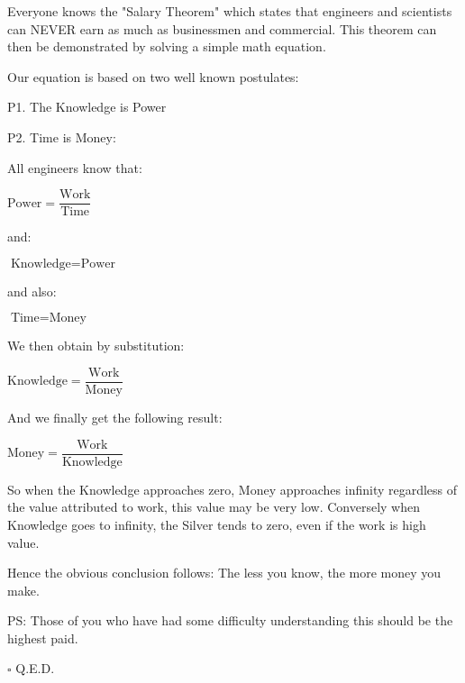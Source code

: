 Everyone knows the "Salary Theorem" which states that engineers and scientists can NEVER earn as much as businessmen and commercial. This theorem can then be demonstrated by solving a simple math equation.

Our equation is based on two well known postulates:

P1. The Knowledge is Power

P2. Time is Money:

All engineers know that:

\begin{center}
$\text{Power}=\dfrac{\text{Work}}{\text{Time}}$
\end{center}

and:

\begin{center}
$\text{Knowledge}=\text{Power}$
\end{center}

and also:

\begin{center}
$\text{Time}=\text{Money}$
\end{center}

We then obtain by substitution: 

\begin{center}
$\text{Knowledge}=\dfrac{\text{Work}}{\text{Money}}$
\end{center}

And we finally get the following result: 

\begin{center}
$\text{Money}=\dfrac{\text{Work}}{\text{Knowledge}}$
\end{center}

So when the Knowledge approaches zero, Money approaches infinity regardless of the value attributed to work, this value may be very low. Conversely when Knowledge goes to infinity, the Silver tends to zero, even if the work is high value.

Hence the obvious conclusion follows: The less you know, the more money you make.

PS: Those of you who have had some difficulty understanding this should be the highest paid.

	\begin{flushright}
		$\square$  Q.E.D.
	\end{flushright}
	\begin{center}\underline{\hspace{5 cm}}\end{center}
	
